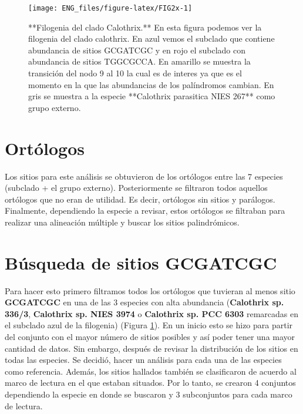 \documentclass[
]{book}
\begin{document}
\begin{figure}

{\centering \texttt{[image: ENG\_files/figure-latex/FIG2x-1]} 

}

\caption{**Filogenia del clado Calothrix.** En esta figura podemos ver la filogenia del clado calothrix. En azul vemos el subclado que contiene abundancia de sitios GCGATCGC y en rojo el subclado con abundancia de sitios TGGCGCCA. En amarillo se muestra la transición del nodo 9 al 10 la cual es de interes ya que es el momento en la que las abundancias de los palíndromos cambian. En gris se muestra a la especie **Calothrix parasitica NIES 267** como grupo externo.}\label{fig:FIG2x}
\end{figure}

\hypertarget{ortuxf3logos-1}{%
\section{Ortólogos}\label{ortuxf3logos-1}}

Los sitios para este análisis se obtuvieron de los ortólogos entre las 7 especies (subclado + el grupo externo). Posteriormente se filtraron todos aquellos ortólogos que no eran de utilidad. Es decir, ortólogos sin sitios y parálogos. Finalmente, dependiendo la especie a revisar, estos ortólogos se filtraban para realizar una alineación múltiple y buscar los sitios palindrómicos.

\hypertarget{buxfasqueda-de-sitios-gcgatcgc}{%
\section{Búsqueda de sitios GCGATCGC}\label{buxfasqueda-de-sitios-gcgatcgc}}

Para hacer esto primero filtramos todos los ortólogos que tuvieran al menos sitio \textbf{GCGATCGC} en una de las 3 especies con alta abundancia (\textbf{Calothrix sp. 336/3}, \textbf{Calothrix sp. NIES 3974} o \textbf{Calothrix sp. PCC 6303} remarcadas en el subclado azul de la filogenia) (Figura \ref{fig:FIG2x}). En un inicio esto se hizo para partir del conjunto con el mayor número de sitios posibles y así poder tener una mayor cantidad de datos. Sin embargo, después de revisar la distribución de los sitios en todas las especies. Se decidió, hacer un análisis para cada una de las especies como referencia. Además, los sitios hallados también se clasificaron de acuerdo al marco de lectura en el que estaban situados. Por lo tanto, se crearon 4 conjuntos dependiendo la especie en donde se buscaron y 3 subconjuntos para cada marco de lectura.
\end{document}
